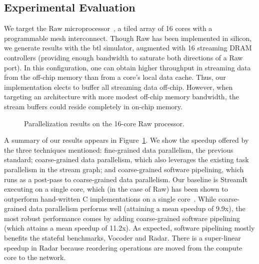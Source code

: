 \subsection*{Experimental Evaluation}


We target the Raw microprocessor~\cite{raw10,raw}, a tiled array of 16
cores with a programmable mesh interconnect.  Though Raw has been
implemented in silicon, we generate results with the btl simulator,
augmented with 16 streaming DRAM controllers (providing enough
bandwidth to saturate both directions of a Raw port).  In this
configuration, one can obtain higher throughput in streaming data from
the off-chip memory than from a core's local data cache.  Thus, our
implementation elects to buffer all streaming data off-chip.  However,
when targeting an architecture with more modest off-chip memory
bandwidth, the stream buffers could reside completely in on-chip
memory.

\begin{figure}[t]
\centering
{}
\caption[Parallelization results.]{Parallelization results on the
  16-core Raw processor\protect\footnotemark[1].\protect\label{fig:par-results}}
\end{figure}


A summary of our results appears in Figure~\ref{fig:par-results}.  We
show the speedup offered by the three techniques mentioned:
fine-grained data parallelism, the previous standard; coarse-grained
data parallelism, which also leverages the existing task parallelism
in the stream graph; and coarse-grained software pipelining, which
runs as a post-pass to coarse-grained data parallelism.  Our baseline
is StreamIt executing on a single core, which (in the case of Raw) has
been shown to outperform hand-written C implementations on a single
core~\cite{taylor2004}.  While coarse-grained data parallelism performs
well (attaining a mean speedup of 9.9x), the most robust performance
comes by adding coarse-grained software pipelining (which attains a
mean speedup of 11.2x).  As expected, software pipelining mostly
benefits the stateful benchmarks, Vocoder and Radar.  There is a
super-linear speedup in Radar because reordering operations are moved
from the compute core to the network.

